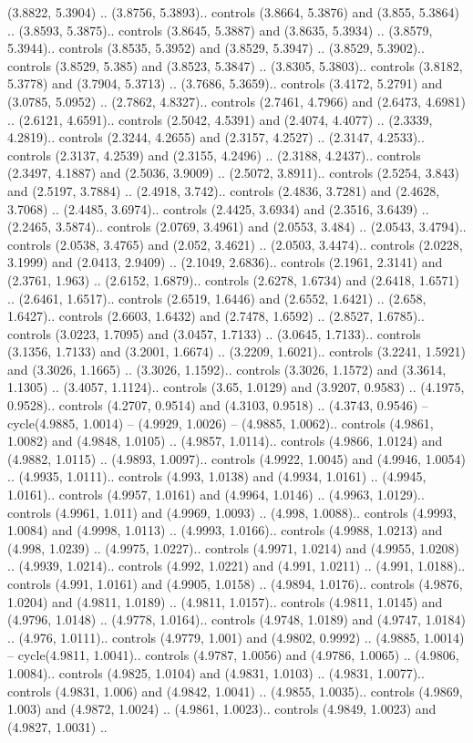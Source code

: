 (3.8822, 5.3904) .. (3.8756, 5.3893).. controls (3.8664, 5.3876) and (3.855, 5.3864) .. (3.8593, 5.3875).. controls (3.8645, 5.3887) and (3.8635, 5.3934) .. (3.8579, 5.3944).. controls (3.8535, 5.3952) and (3.8529, 5.3947) .. (3.8529, 5.3902).. controls (3.8529, 5.385) and (3.8523, 5.3847) .. (3.8305, 5.3803).. controls (3.8182, 5.3778) and (3.7904, 5.3713) .. (3.7686, 5.3659).. controls (3.4172, 5.2791) and (3.0785, 5.0952) .. (2.7862, 4.8327).. controls (2.7461, 4.7966) and (2.6473, 4.6981) .. (2.6121, 4.6591).. controls (2.5042, 4.5391) and (2.4074, 4.4077) .. (2.3339, 4.2819).. controls (2.3244, 4.2655) and (2.3157, 4.2527) .. (2.3147, 4.2533).. controls (2.3137, 4.2539) and (2.3155, 4.2496) .. (2.3188, 4.2437).. controls (2.3497, 4.1887) and (2.5036, 3.9009) .. (2.5072, 3.8911).. controls (2.5254, 3.843) and (2.5197, 3.7884) .. (2.4918, 3.742).. controls (2.4836, 3.7281) and (2.4628, 3.7068) .. (2.4485, 3.6974).. controls (2.4425, 3.6934) and (2.3516, 3.6439) .. (2.2465, 3.5874).. controls (2.0769, 3.4961) and (2.0553, 3.484) .. (2.0543, 3.4794).. controls (2.0538, 3.4765) and (2.052, 3.4621) .. (2.0503, 3.4474).. controls (2.0228, 3.1999) and (2.0413, 2.9409) .. (2.1049, 2.6836).. controls (2.1961, 2.3141) and (2.3761, 1.963) .. (2.6152, 1.6879).. controls (2.6278, 1.6734) and (2.6418, 1.6571) .. (2.6461, 1.6517).. controls (2.6519, 1.6446) and (2.6552, 1.6421) .. (2.658, 1.6427).. controls (2.6603, 1.6432) and (2.7478, 1.6592) .. (2.8527, 1.6785).. controls (3.0223, 1.7095) and (3.0457, 1.7133) .. (3.0645, 1.7133).. controls (3.1356, 1.7133) and (3.2001, 1.6674) .. (3.2209, 1.6021).. controls (3.2241, 1.5921) and (3.3026, 1.1665) .. (3.3026, 1.1592).. controls (3.3026, 1.1572) and (3.3614, 1.1305) .. (3.4057, 1.1124).. controls (3.65, 1.0129) and (3.9207, 0.9583) .. (4.1975, 0.9528).. controls (4.2707, 0.9514) and (4.3103, 0.9518) .. (4.3743, 0.9546) -- cycle(4.9885, 1.0014) -- (4.9929, 1.0026) -- (4.9885, 1.0062).. controls (4.9861, 1.0082) and (4.9848, 1.0105) .. (4.9857, 1.0114).. controls (4.9866, 1.0124) and (4.9882, 1.0115) .. (4.9893, 1.0097).. controls (4.9922, 1.0045) and (4.9946, 1.0054) .. (4.9935, 1.0111).. controls (4.993, 1.0138) and (4.9934, 1.0161) .. (4.9945, 1.0161).. controls (4.9957, 1.0161) and (4.9964, 1.0146) .. (4.9963, 1.0129).. controls (4.9961, 1.011) and (4.9969, 1.0093) .. (4.998, 1.0088).. controls (4.9993, 1.0084) and (4.9998, 1.0113) .. (4.9993, 1.0166).. controls (4.9988, 1.0213) and (4.998, 1.0239) .. (4.9975, 1.0227).. controls (4.9971, 1.0214) and (4.9955, 1.0208) .. (4.9939, 1.0214).. controls (4.992, 1.0221) and (4.991, 1.0211) .. (4.991, 1.0188).. controls (4.991, 1.0161) and (4.9905, 1.0158) .. (4.9894, 1.0176).. controls (4.9876, 1.0204) and (4.9811, 1.0189) .. (4.9811, 1.0157).. controls (4.9811, 1.0145) and (4.9796, 1.0148) .. (4.9778, 1.0164).. controls (4.9748, 1.0189) and (4.9747, 1.0184) .. (4.976, 1.0111).. controls (4.9779, 1.001) and (4.9802, 0.9992) .. (4.9885, 1.0014) -- cycle(4.9811, 1.0041).. controls (4.9787, 1.0056) and (4.9786, 1.0065) .. (4.9806, 1.0084).. controls (4.9825, 1.0104) and (4.9831, 1.0103) .. (4.9831, 1.0077).. controls (4.9831, 1.006) and (4.9842, 1.0041) .. (4.9855, 1.0035).. controls (4.9869, 1.003) and (4.9872, 1.0024) .. (4.9861, 1.0023).. controls (4.9849, 1.0023) and (4.9827, 1.0031) .. 
